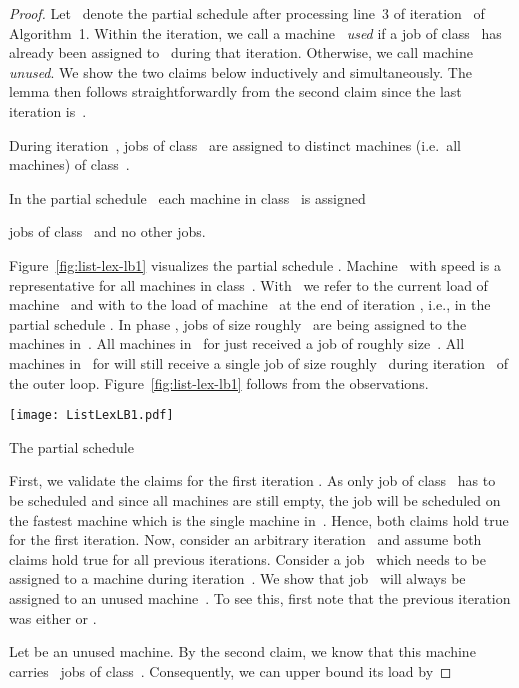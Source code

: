 \documentclass[a4paper,11pt,fleqn]{article}
\begin{document}
\begin{proof}
Let~ denote the partial schedule after processing line~3
of iteration~ of Algorithm~1. Within the 
iteration, we call a machine~ \emph{used} if a job of
class~ has already been assigned to~ during that iteration. Otherwise, we call machine~ \emph{unused}. We show the two claims below inductively and simultaneously. The lemma then follows straightforwardly from the second claim since the last iteration is~.

\begin{claim}
During iteration~,  jobs of class~ are
assigned to  distinct machines (i.e.\ all machines) of
class~.
\end{claim}

\begin{claim}
\label{claim:nrjobs-partialschedule}
In the partial schedule~ each machine in class~ is assigned

jobs of class~ and no other jobs.
\end{claim}

Figure~\ref{fig:list-lex-lb1} visualizes the partial schedule
. Machine~ with speed  is a representative
for all machines in class~. With~ we refer to the current
load of machine~ and with  to the load of machine~ at
the end of iteration , i.e., in the partial schedule
. In phase ,  jobs of size
roughly~ are being assigned to the  machines
in~. All machines in~ for  just received
a job of roughly size~. All machines in~ for
 will still receive a single job of
size roughly~ during iteration~ of the outer loop. Figure~\ref{fig:list-lex-lb1} follows from the observations.

\begin{artclfig}
  \texttt{[image: ListLexLB1.pdf]}
  \caption{The partial schedule }
  \label{fig:list-lex-lb1}
\end{artclfig}

First, we validate the claims for the first iteration . As only
 job of class~ has to be scheduled and since all machines
are still empty, the job will be scheduled on the fastest machine which
is the single machine in~. Hence, both claims hold true for the
first iteration. Now, consider an arbitrary iteration~ and
assume both claims hold true for all previous iterations. Consider a
job~ which needs to be assigned to a machine during
iteration~. We show that job~ will always be assigned to
an unused machine~. To see this, first note that the previous
iteration was either  or .

Let  be an unused machine. By the second claim, we know
that this machine carries~ jobs of class~. Consequently, we
can upper bound its load by


\end{proof}
\end{document}
